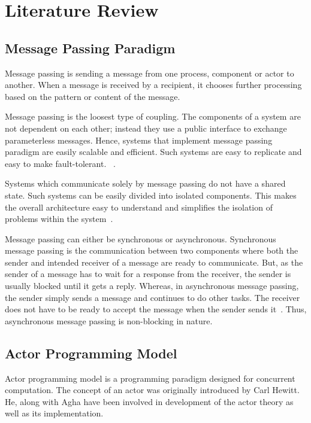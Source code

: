 \chapter{Literature Review}\label{chapter:literature_review}

\section{Message Passing Paradigm}
\label{sec:messagePassing}
  Message passing is sending a message from one process, component or actor to another. When a message is received by a recipient, it chooses further processing based on the pattern or content of the message.

  Message passing is the loosest type of coupling. The components of a system are not dependent on each other; instead they use a public interface to exchange parameterless messages\cite{joecelko}. Hence, systems that implement message passing paradigm are easily scalable and efficient. Such systems are easy to replicate and easy to make fault-tolerant.
~\cite{Armstrong:2010:ERL:1810891.1810910}.

  Systems which communicate solely by message passing do not have a shared state. Such systems can be easily divided into isolated components. This makes the overall architecture easy to understand and simplifies the isolation of problems within the system~\cite{Armstrong:2010:ERL:1810891.1810910}.

  Message passing can either be synchronous or asynchronous. Synchronous message passing is the communication between two components where both the sender and intended receiver of a message are ready to communicate. But, as the sender of a message has to wait for a response from the receiver, the sender is usually blocked until it gets a reply. Whereas, in asynchronous message passing, the sender simply sends a message and continues to do other tasks. The receiver does not have to be ready to accept the message when the sender sends it~\cite{agha}. Thus, asynchronous message passing is non-blocking in nature.

\section{Actor Programming Model}
\label{sec:actorProgramming}
  Actor programming model is a programming paradigm designed for concurrent computation. The concept of an actor was originally introduced by Carl Hewitt\cite{hewitt}. He, along with Agha\cite{agha} have been involved in development of the actor theory as well as its implementation.

